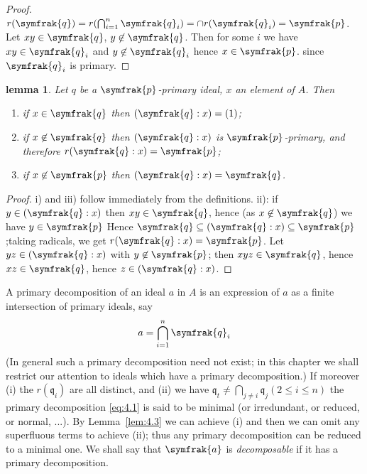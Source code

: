 \documentclass{standalone}
\newtheorem{lemma}[theorem]{lemma}
\theoremstyle{definition}
\theoremstyle{remark}
\begin{document}
\begin{proof}
  $r(\symfrak{q}) = r(\bigcap_{i=1}^{n} \symfrak{q}_i) = \cap r(\symfrak{q}_i) =
  \symfrak{p}$. Let $xy\in \symfrak{q}$, $y \not\in \symfrak{q}$. Then for some
  $i$ we have $xy \in \symfrak{q}_i$ and $y\not\in \symfrak{q}_i$ hence $x\in
  \symfrak{p}$. since $\symfrak{q}_i$ is primary.
\end{proof}
\begin{lemma}\label{lem:4.4}
  Let $q$ be a $\symfrak{p}$-primary ideal, $x$ an element of $A$. Then
\begin{enumerate}
\item if $x \in \symfrak{q}$ then $(\symfrak{q}:x) = (1)$;
\item if $x \not\in \symfrak{q}$ then $(\symfrak{q}:x)$ is
$\symfrak{p}$-primary, and therefore $r(\symfrak{q}:x) = \symfrak{p}$;
\item if $x\not\in \symfrak{p}$ then $(\symfrak{q}:x) = \symfrak{q}$.
\end{enumerate}
\end{lemma}
\begin{proof}
  i) and iii) follow immediately from the definitions. ii): if $y \in
  (\symfrak{q}:x)$ then $xy \in \symfrak{q}$, hence (as $x \not\in \symfrak{q}$)
  we have $y\in \symfrak{p}$ Hence $\symfrak{q} \subseteq
  (\symfrak{q}:x)\subseteq \symfrak{p}$;taking radicals, we get
  $r(\symfrak{q}:x) = \symfrak{p}$. Let $yz\in(\symfrak{q}:x)$ with $y\not\in
  \symfrak{p}$; then $xyz \in \symfrak{q}$, hence $xz \in \symfrak{q}$, hence $z
  \in (\symfrak{q}:x)$.
\end{proof}
A primary decomposition of an ideal $a$ in $A$ is an expression of $a$ as a
finite intersection of primary ideals, say
\begin{equation}
  \label{eq:4.1}
  a=\bigcap_{i=1}^{n}\symfrak{q}_i
\end{equation}
(In general such a primary decomposition need not exist; in this chapter we
shall restrict our attention to ideals which have a primary decomposition.) If
moreover (i) the $r\left(\mathfrak{q}_{i}\right)$ are all distinct, and (ii) we
have $\mathfrak{q}_{t} \neq \bigcap_{j \neq i} \mathfrak{q}_{j}(2 \leqslant i
\leqslant n)$ the primary decomposition \eqref{eq:4.1} is said to be minimal (or
irredundant, or reduced, or normal, ...). By Lemma~\ref{lem:4.3} we can achieve (i) and then
we can omit any superfluous terms to achieve (ii); thus any primary
decomposition can be reduced to a minimal one. We shall say that $\symfrak{a}$ is
\textit{decomposable} if it has a primary decomposition.
\end{document}
